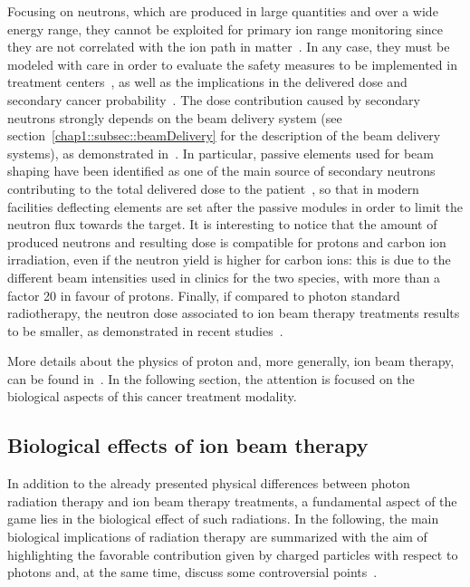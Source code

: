 Focusing on neutrons, which are produced in large quantities and over a wide energy range, they cannot be exploited for primary ion range monitoring since they are not correlated with the ion path in matter~\parencite{Testa2010}. In any case, they must be modeled with care in order to evaluate the safety measures to be implemented in treatment centers~\parencite{Newhauser2002}, as well as the implications in the delivered dose and secondary cancer probability~\parencite{Newhauser2011}. The dose contribution caused by secondary neutrons strongly depends on the beam delivery system (see section~\ref{chap1::subsec::beamDelivery} for the description of the beam delivery systems), as demonstrated in~\cite{Gottschalk2006}. In particular, passive elements used for beam shaping have been identified as one of the main source of secondary neutrons contributing to the total delivered dose to the patient~\parencite{Yan2002}, so that in modern facilities deflecting elements are set after the passive modules in order to limit the neutron flux towards the target. It is interesting to notice that the amount of produced neutrons and resulting dose is compatible for protons and carbon ion irradiation, even if the neutron yield is higher for carbon ions: this is due to the different beam intensities used in clinics for the two species, with more than a factor 20 in favour of protons. Finally, if compared to photon standard radiotherapy, the neutron dose associated to ion beam therapy treatments results to be smaller, as demonstrated in recent studies~\parencite{Schneider2015}. 

More details about the physics of proton and, more generally, ion beam therapy, can be found in~\parencite{Lomax2009, Belkic2010, Schardt2010, Bichsel2013, Nupecc2014,  Newhauser2015, Durante2016}. In the following section, the attention is focused on the biological aspects of this cancer treatment modality.


\subsection{Biological effects of ion beam therapy}\label{chap1::subsec::bioEffects} 
In addition to the already presented physical differences between photon radiation therapy and ion beam therapy treatments, a fundamental aspect of the game lies in the biological effect of such radiations. In the following, the main biological implications of radiation therapy are summarized with the aim of highlighting the favorable contribution given by charged particles with respect to photons and, at the same time, discuss some controversial points~\parencite{Paganetti2013}.

